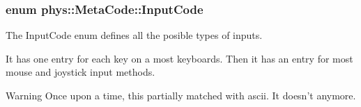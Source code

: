 \hypertarget{classphys_1_1MetaCode_a3e501cbb5bf0f6f1fdb7211465bda8d8}{
\subsubsection[{InputCode}]{\setlength{\rightskip}{0pt plus 5cm}enum {\bf phys::MetaCode::InputCode}}}
\label{da/dc9/classphys_1_1MetaCode_a3e501cbb5bf0f6f1fdb7211465bda8d8}


The InputCode enum defines all the posible types of inputs. 

It has one entry for each key on a most keyboards. Then it has an entry for most mouse and joystick input methods. \begin{DoxyWarning}{Warning}
Once upon a time, this partially matched with ascii. It doesn't anymore. 
\end{DoxyWarning}
